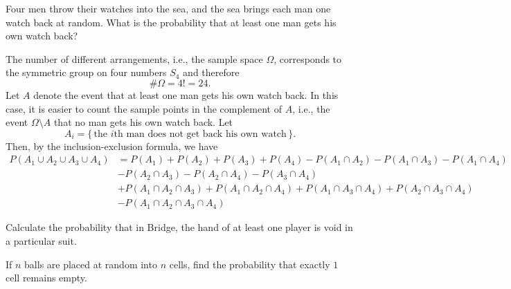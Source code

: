 \begin{problem}[Handout 2, \# 5]
  Four men throw their watches into the sea, and the sea brings each man
  one watch back at random. What is the probability that at least one man
  gets his own watch back?
\end{problem}
\begin{solution}
  The number of different arrangements, i.e., the sample space \(\Omega\),
  corresponds to the symmetric group on four numbers \(S_4\) and therefore
  \begin{equation}
    \label{eq:2-1}
    \#\Omega=4!=24.
  \end{equation}
  Let \(A\) denote the event that at least one man gets his own watch
  back. In this case, it is easier to count the sample points in the
  complement of \(A\), i.e., the event \(\Omega\setminus A\) that no man
  gets his own watch back. Let
  \[
    A_i=\bigl\{\,\text{the \(i\)th man does not get back his own
      watch}\,\bigr\}.
  \]
  Then, by the inclusion-exclusion formula, we have
  \begin{align*}
    P(A_1\cup A_2\cup A_3\cup A_4)
    &=P(A_1)+P(A_2)+P(A_3)+P(A_4)-P(A_1\cap A_2)-P(A_1\cap A_3)-P(A_1\cap
      A_4)\\
    &-P(A_2\cap A_3)-P(A_2\cap A_4)-P(A_3\cap A_4)\\
    &+P(A_1\cap A_2\cap A_3)+P(A_1\cap A_2\cap A_4)+P(A_1\cap A_3\cap
      A_4)+P(A_2\cap A_3\cap A_4)\\
    &-P(A_1\cap A_2\cap A_3\cap A_4)
  \end{align*}
\end{solution}
\newpage

\begin{problem}[Handout 2, \#7]
  Calculate the probability that in Bridge, the hand of at least one player
  is void in a particular suit.
\end{problem}
\begin{solution}
\end{solution}
\newpage

\begin{problem}[Handout 2, \# 12]
  If \(n\) balls are placed at random into \(n\) cells, find the
  probability that exactly \(1\) cell remains empty.
\end{problem}
\begin{solution}
\end{solution}
\newpage


